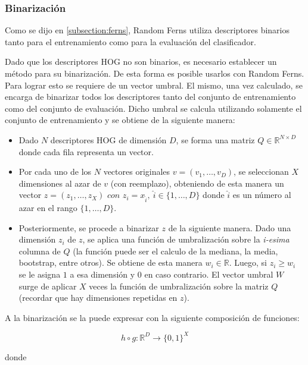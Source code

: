 	
\subsubsection{Binarización}
\label{subsubsection:binarizacion}
	
		Como se dijo en \ref{subsection:ferns}, Random Ferns utiliza descriptores binarios tanto para el entrenamiento como para la evaluación del clasificador.
		
		Dado que los descriptores HOG no son binarios, es necesario establecer un método para su binarización. De esta forma es posible usarlos con Random Ferns. Para lograr esto se requiere de un vector umbral. El mismo, una vez  calculado, se encarga de binarizar todos los descriptores tanto del conjunto de entrenamiento como del conjunto de evaluación. Dicho umbral se calcula utilizando solamente el conjunto de entrenamiento y se obtiene de la siguiente manera:
		
		\begin{itemize}
		
			\item Dado $N$ descriptores HOG de dimensión $D$, se forma una matriz $Q \in \mathbb{R}^{N \times D}$ donde cada fila representa un vector.
			\item Por cada uno de los $N$ vectores originales $v=(v_1,\dots,v_D)$, se seleccionan $X$ dimensiones al azar de $v$ (con reemplazo), obteniendo de esta manera un vector $z = (z_1,\dots,z_X) \textit{ con } z_i=x_{\hat{i}},~\hat{i} \in \{1,\dots,D\}$ donde $\hat{i}$ es un número al azar en el rango $\{1,\dots,D\}$.
			\item Posteriormente, se procede a binarizar $z$ de la siguiente manera. Dado una dimensión $z_i$ de $z$, se aplica una función de umbralización sobre la \textit{i-esima} columna de $Q$ (la función puede ser el calculo de la mediana, la media, bootstrap, entre otros). Se obtiene de esta manera $w_i \in \mathbb{R}$. Luego, si $z_i \geq w_i$ se le asigna $1$ a esa dimensión y $0$ en caso contrario. El vector umbral $W$ surge de aplicar $X$ veces la función de umbralización sobre la matriz $Q$ (recordar que hay dimensiones repetidas en $z$).
						
		\end{itemize}
	
	A la binarización se la puede expresar con la siguiente composición de funciones:
	
	$$h \circ g:\mathbb{R}^{D} \rightarrow \{ 0, 1\}^{X}$$
	
	donde
	
